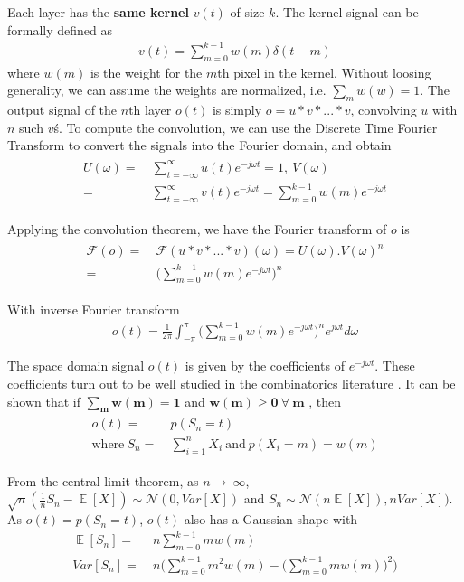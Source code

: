 Each layer has the \textbf{same kernel} $v(t)$ of size $k$. The kernel signal can be formally defined as
\begin{align}
	v(t) = \sum_{m=0}^{k-1} w(m)\delta(t-m)
\end{align}
where $w(m)$ is the weight for the $m$th pixel in the kernel.
Without loosing generality, we can assume the weights are normalized, i.e. $\sum_{m}w(w)=1$. The output signal of the $n$th layer $o(t)$ is simply $o = u * v * ... * v$, convolving $u$ with $n$ such $v$\'s.
To compute the convolution, we can use the Discrete Time Fourier Transform to convert the signals into the Fourier domain, and obtain
\begin{align}
\begin{split}
	U(\omega) =&~ \sum_{t=-\infty}^{\infty} u(t)e^{-j\omega t} = 1, ~V(\omega) \\=&~ \sum_{t=-\infty}^{\infty} v(t)e^{-j\omega t} = \sum_{m=0}^{k-1} w(m)e^{-j\omega t}
\end{split}
\end{align}

Applying the convolution theorem, we have the Fourier transform of $o$ is
\begin{align}
\begin{split}
	\mathcal{F}(o) =&~ \mathcal{F}(u*v*...*v)(\omega) = U(\omega) . V(\omega)^n \\=&~ \Bigg(\sum_{m=0}^{k-1}w(m)e^{-j\omega t}\Bigg)^n
\end{split}
\end{align}

With inverse Fourier transform
\begin{align}
	o(t) = \frac{1}{2\pi}\int_{-\pi}^{\pi}\Big(\sum_{m=0}^{k-1}w(m)e^{-j\omega t}\Big)^ne^{j\omega t} d\omega
\end{align}

The space domain signal $o(t)$ is given by the coefficients of $e^{-j\omega t}$.
These coefficients turn out to be well studied in the combinatorics literature \cite{eger2013restricted}.
It can be shown that if $\mathbf{\sum_{m}w(m) = 1}$  and $\mathbf{w(m) \geq 0 ~\forall~ m}$ , then
\begin{align}
\begin{split}
	o(t) =&~ p(S_n=t)\\ 
	\text{where}~ S_n =&~ \sum_{i=1}^{n} X_i ~\text{and}~p(X_i=m) = w(m)
\end{split}
\end{align}

From the central limit theorem, as $n \rightarrow~\infty$, $\sqrt{n}(\frac{1}{n}S_n - \mathop{\mathbb{E}}[X]) \sim \mathcal{N}(0, Var[X])$ and $S_n \sim \mathcal{N}(n\mathop{\mathbb{E}}[X]), nVar[X])$.
As $o(t) = p(S_n=t)$, $o(t)$ also has a Gaussian shape with
\begin{align}
	\mathop{\mathbb{E}}[S_n] =&~ n\sum_{m=0}^{k-1}mw(m)\\
	Var[S_n] =&~ n \Bigg(\sum_{m=0}^{k-1}m^2w(m) - \Big(\sum_{m=0}^{k-1}mw(m)\Big)^2 \Bigg)
\end{align}

